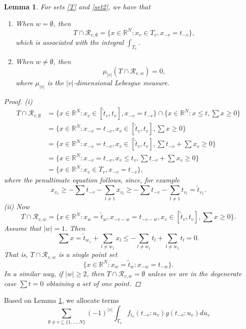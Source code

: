 \documentclass[english, a4paper, 12pt,reqno]{amsart}
\newtheorem{lemma}[defi]{Lemma}
\begin{document}
\begin{lemma}
\label{lemma:intersection}
For sets \eqref{T} and \eqref{set2}, we have that
\begin{enumerate}[label=(\roman*)]
\item When $w = \emptyset$, then
$$T \cap \mathcal{R}_{v, \emptyset} = \{x\in \mathbb{R}^N : x_v\in T_v, x_{-v} = t_{-v}\}, $$
which is associated with the integral $\int_{T_v}$.
\item When $w \neq \emptyset$, then
$$\mu_{|v|}(T \cap \mathcal{R}_{v, w}) = 0,$$
where $\mu_{|v|}$ is the $|v|$-dimensional Lebesgue measure.
\end{enumerate}
\begin{proof}
(i) 
\begin{equation*}
\begin{split}
T \cap \mathcal{R}_{v, \emptyset} &= \{x\in\mathbb{R}^N: x_v \in [\tilde{t}_v, t_v], x_{-v} = t_{-v}\} \cap \{x\in\mathbb{R}^N: x \leq t, \sum x \geq 0\}\\
&= \{x\in\mathbb{R}^N : x_{-v} = t_{-v}, x_v\in [\tilde{t}_v, t_v], \sum x \geq 0\}\\
&= \{x\in\mathbb{R}^N : x_{-v} = t_{-v}, x_v\in [\tilde{t}_v, t_v], \sum t_{-v} + \sum x_v \geq 0\}\\
&= \{x\in\mathbb{R}^N : x_{-v} = t_{-v}, x_v\leq t_v, \sum t_{-v} + \sum x_v \geq 0\}\\
&= \{x\in \mathbb{R}^N : x_v\in T_v, x_{-v} = t_{-v}\},
\end{split}   
\end{equation*}
where the penultimate equation follows, since, for example
$$x_{v_1} \geq - \sum t_{-v} - \sum_{l\neq 1} x_{v_l} \geq - \sum t_{-v} - \sum_{l\neq 1} t_{v_l} = \tilde{t}_{v_1}.$$
(ii) Now
$$T \cap \mathcal{R}_{v, w} =  \{x\in\mathbb{R}^N : x_w = \tilde{t}_w, x_{-v-w} = t_{-v-w}, x_v\in [\tilde{t}_v, t_v], \sum x \geq 0\}.$$
Assume that $|w| = 1$. Then
$$ \sum x = \tilde{t}_{w_1} + \sum_{l\neq w_1} x_l \leq -\sum_{l \neq w_1} t_l + \sum_{l\neq w_1} t_l = 0.$$
That is, $T \cap \mathcal{R}_{v, w}$ is a single point set
$$\{ x\in\mathbb{R}^N : x_w = \tilde{t}_w : x_{-w} = t_{-w}\}.$$
In a similar way, if $|w| \geq 2$, then $T \cap \mathcal{R}_{v, w} = \emptyset$ unless we are in the degenerate case $\sum t = 0$ obtaining a set of one point. 
\end{proof}
\end{lemma}
Based on Lemma \ref{lemma:intersection}, we allocate terms
$$\sum_{\emptyset\neq v \subseteq \{1,\dots,N\}} (-1)^{|v|}\int_{T_v} f_{t_v}(t_{-v}:u_v) g(t_{-v}:u_v)du_v$$
\end{document}
